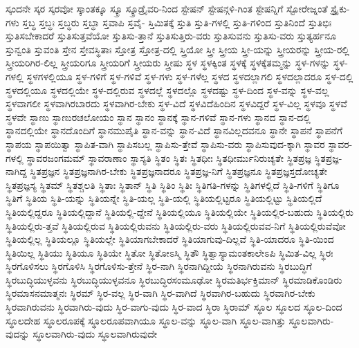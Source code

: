 {ಸ್ಕಂದನೇ
ಸ್ಕರ
ಸ್ಕರವೋ
ಸ್ಕಾಂತಕ್ಕೂ
ಸ್ಕ್ರೂ
ಸ್ಕ್ರೂಡ್ರೈವರಿ-ನಿಂದ
ಸ್ಟೇಷನ್
ಸ್ಟೇಷನ್ಗಳಿ-ಗಿಂತ
ಸ್ಟೇಷನ್ನಿಗೆ
ಸ್ಟೋರೇಜ್ನಂತೆ
ಸ್ಟ್ರೈಕು-ಗಳು
ಸ್ತಬ್ಧ
ಸ್ತಬ್ಧಃ
ಸ್ತಬ್ಧರು
ಸ್ತಬ್ಧಾ
ಸ್ತವಾಪಿ
ಸ್ತವೈ-
ಸ್ತಿಮಿತಕ್ಕೆ
ಸ್ತುತಿ
ಸ್ತುತಿ-ಗಳಲ್ಲಿ
ಸ್ತುತಿ-ಗಳಿಂದ
ಸ್ತುತಿನಿಂದೆ
ಸ್ತುತಿಭಿಃ
ಸ್ತುತಿಸಬೇಕಾದರೆ
ಸ್ತುತಿಸುತ್ತವೆಯೋ
ಸ್ತುತಿಸು-ತ್ತಾನೆ
ಸ್ತುತಿಸುತ್ತಿರು-ವರು
ಸ್ತುತಿಸುವನು
ಸ್ತುತಿಸು-ವರು
ಸ್ತುತ್ಯರ್ಹನೂ
ಸ್ತುನ್ವಂತಿ
ಸ್ತುವಂತಿ
ಸ್ತೇನ
ಸ್ತೇವಸ್ಥಿತಾಃ
ಸ್ತೋತ್ರ
ಸ್ತೋತ್ರ-ದಲ್ಲಿ
ಸ್ತ್ರಿಯೋ
ಸ್ತ್ರೀ
ಸ್ತ್ರೀಯ
ಸ್ತ್ರೀ-ಯನ್ನು
ಸ್ತ್ರೀಯರನ್ನು
ಸ್ತ್ರೀಯ-ರಲ್ಲಿ
ಸ್ತ್ರೀಯರಿಗಿರ-ಲಿಲ್ಲ
ಸ್ತ್ರೀಯರಿಗೂ
ಸ್ತ್ರೀಯರಿಗೆ
ಸ್ತ್ರೀಯರು
ಸ್ತ್ರೀಷು
ಸ್ಥಳ
ಸ್ಥಳಕ್ಕಿಂತ
ಸ್ಥಳಕ್ಕೆ
ಸ್ಥಳಕ್ಕೆತಮ್ಮನ್ನು
ಸ್ಥಳ-ಗಳನ್ನು
ಸ್ಥಳ-ಗಳಲ್ಲಿ
ಸ್ಥಳಗಳಲ್ಲಿಯೂ
ಸ್ಥಳ-ಗಳಿಗೆ
ಸ್ಥಳ-ಗಳಿವೆ
ಸ್ಥಳ-ಗಳು
ಸ್ಥಳ-ಗಳೆಲ್ಲ
ಸ್ಥಳದ
ಸ್ಥಳದಲ್ಲಾಗಲಿ
ಸ್ಥಳದಲ್ಲಾದರೂ
ಸ್ಥಳ-ದಲ್ಲಿ
ಸ್ಥಳದಲ್ಲಿಯೂ
ಸ್ಥಳದಲ್ಲಿಯೇ
ಸ್ಥಳ-ದಲ್ಲಿರುವ
ಸ್ಥಳದಲ್ಲೆ
ಸ್ಥಳದಲ್ಲೊ
ಸ್ಥಳದಷ್ಟು
ಸ್ಥಳ-ದಿಂದ
ಸ್ಥಳ-ವನ್ನು
ಸ್ಥಳ-ವಲ್ಲ
ಸ್ಥಳವಾಗಲೀ
ಸ್ಥಳವಾಗಿರಬಾರದು
ಸ್ಥಳವಾಗಿರ-ಬೇಕು
ಸ್ಥಳ-ವಿದೆ
ಸ್ಥಳವಿದೆಹಿಂದಿನ
ಸ್ಥಳವಿದ್ದರೆ
ಸ್ಥಳ-ವಿಲ್ಲ
ಸ್ಥಳವೂ
ಸ್ಥಳವೆ
ಸ್ಥಳವೇ
ಸ್ಥಾಣು
ಸ್ಥಾಣುರಚಲೋಯಂ
ಸ್ಥಾನ
ಸ್ಥಾನಂ
ಸ್ಥಾನಕ್ಕೆ
ಸ್ಥಾನ-ಗಳಿವೆ
ಸ್ಥಾನ-ಗಳು
ಸ್ಥಾನದ
ಸ್ಥಾನ-ದಲ್ಲಿ
ಸ್ಥಾನದಲ್ಲಿಯೇ
ಸ್ಥಾನದೊಂದಿಗೆ
ಸ್ಥಾನಮುಪೈತಿ
ಸ್ಥಾನ-ವನ್ನು
ಸ್ಥಾನ-ವಿದೆ
ಸ್ಥಾನವಿಲ್ಲದವನೂ
ಸ್ಥಾನೇ
ಸ್ಥಾಪನೆ
ಸ್ಥಾಪನೆಗೆ
ಸ್ಥಾಪಯ
ಸ್ಥಾಪಯಿತ್ವಾ
ಸ್ಥಾಪಿತ-ವಾಗಿ
ಸ್ಥಾಪಿಸಬಲ್ಲ
ಸ್ಥಾಪಿಸು-ತ್ತೇವೆ
ಸ್ಥಾಪಿಸು-ವರು
ಸ್ಥಾಪಿಸುವುದ-ಕ್ಕಾಗಿ
ಸ್ಥಾವರ
ಸ್ಥಾವರ-ಗಳಲ್ಲಿ
ಸ್ಥಾವರಜಂಗಮಮ್
ಸ್ಥಾವರಾಣಾಂ
ಸ್ಥಾಸ್ಯತಿ
ಸ್ಥಿತಂ
ಸ್ಥಿತಃ
ಸ್ಥಿತಧೀಃ
ಸ್ಥಿತಧೀರ್ಮುನಿರುಚ್ಯತೇ
ಸ್ಥಿತಪ್ರಜ್ಞ
ಸ್ಥಿತಪ್ರಜ್ಞ-ನಾಗಿದ್ದ
ಸ್ಥಿತಪ್ರಜ್ಞನ
ಸ್ಥಿತಪ್ರಜ್ಞನಾಗಿರ-ಬೇಕು
ಸ್ಥಿತಪ್ರಜ್ಞನಾದರೂ
ಸ್ಥಿತಪ್ರಜ್ಞ-ನಿಗೆ
ಸ್ಥಿತಪ್ರಜ್ಞನೂ
ಸ್ಥಿತಪ್ರಜ್ಞಸ್ತದೋಚ್ಯತೇ
ಸ್ಥಿತಪ್ರಜ್ಞಸ್ಯ
ಸ್ಥಿತಮ್
ಸ್ಥಿತಶ್ಚಲತಿ
ಸ್ಥಿತಾಃ
ಸ್ಥಿತಾನ್
ಸ್ಥಿತಿ
ಸ್ಥಿತಿಂ
ಸ್ಥಿತಿಃ
ಸ್ಥಿತಿಗತಿ-ಗಳನ್ನು
ಸ್ಥಿತಿಗಳಲ್ಲಿದೆ
ಸ್ಥಿತಿ-ಗಳಿಗೆ
ಸ್ಥಿತಿಗೂ
ಸ್ಥಿತಿಗೆ
ಸ್ಥಿತಿಯ
ಸ್ಥಿತಿ-ಯನ್ನು
ಸ್ಥಿತಿಯನ್ನೇ
ಸ್ಥಿತಿ-ಯಲ್ಲ
ಸ್ಥಿತಿ-ಯಲ್ಲಿ
ಸ್ಥಿತಿಯಲ್ಲಿಟ್ಟರೂ
ಸ್ಥಿತಿಯಲ್ಲಿಟ್ಟು
ಸ್ಥಿತಿಯಲ್ಲಿದೆ
ಸ್ಥಿತಿಯಲ್ಲಿದ್ದರೂ
ಸ್ಥಿತಿಯಲ್ಲಿದ್ದಾನೆ
ಸ್ಥಿತಿಯಲ್ಲಿ-ದ್ದೇನೆ
ಸ್ಥಿತಿಯಲ್ಲಿಯೂ
ಸ್ಥಿತಿಯಲ್ಲಿಯೇ
ಸ್ಥಿತಿಯಲ್ಲಿರ-ಬಹುದು
ಸ್ಥಿತಿಯಲ್ಲಿರು
ಸ್ಥಿತಿಯಲ್ಲಿರು-ತ್ತವೆ
ಸ್ಥಿತಿಯಲ್ಲಿರುವ
ಸ್ಥಿತಿಯಲ್ಲಿರುವನು
ಸ್ಥಿತಿಯಲ್ಲಿರು-ವರು
ಸ್ಥಿತಿಯಲ್ಲಿರುವವ-ನಿಗೆ
ಸ್ಥಿತಿಯಲ್ಲಿರುವೆವೋ
ಸ್ಥಿತಿಯಲ್ಲಿಲ್ಲ
ಸ್ಥಿತಿಯಲ್ಲೂ
ಸ್ಥಿತಿಯಲ್ಲೇ
ಸ್ಥಿತಿಯಾಗಬೇಕಾದರೆ
ಸ್ಥಿತಿಯಾಗುವು-ದಿಲ್ಲವೆ
ಸ್ಥಿತಿ-ಯಾದರೂ
ಸ್ಥಿತಿ-ಯಿಂದ
ಸ್ಥಿತಿಯಿಲ್ಲ
ಸ್ಥಿತಿಯು
ಸ್ಥಿತಿಯೂ
ಸ್ಥಿತಿಯೇ
ಸ್ಥಿತೋ
ಸ್ಥಿತೋಽಸ್ಮಿ
ಸ್ಥಿತೌ
ಸ್ಥಿತ್ವಾಸ್ಯಾಮಂತಕಾಲೇಽಪಿ
ಸ್ಥಿಮಿತ-ವಿಲ್ಲ
ಸ್ಥಿರಃ
ಸ್ಥಿರಗೊಳಿಸಲು
ಸ್ಥಿರಗೊಳಿಸಿ
ಸ್ಥಿರಗೊಳಿಸು-ತ್ತೇನೆ
ಸ್ಥಿರ-ನಾಗಿ
ಸ್ಥಿರನಾಗಿದ್ದೀಯೆ
ಸ್ಥಿರನಾಗಿರುವನು
ಸ್ಥಿರಬುದ್ಧಿಗೆ
ಸ್ಥಿರಬುದ್ಧಿಯುಳ್ಳವನು
ಸ್ಥಿರಬುದ್ಧಿಯುಳ್ಳವನೂ
ಸ್ಥಿರಬುದ್ಧಿರಸಂಮೂಢೋ
ಸ್ಥಿರಮತಿರ್ಭಕ್ತಿಮಾನ್
ಸ್ಥಿರಮಾಡಿಕೊಂಡಿರು
ಸ್ಥಿರಮಾಸನಮಾತ್ಮನಃ
ಸ್ಥಿರಮ್
ಸ್ಥಿರ-ವಲ್ಲ
ಸ್ಥಿರ-ವಾಗಿ
ಸ್ಥಿರ-ವಾಗಿದೆ
ಸ್ಥಿರವಾಗಿರ-ಬಹುದು
ಸ್ಥಿರವಾಗಿರ-ಬೇಕು
ಸ್ಥಿರವಾಗಿರುವನು
ಸ್ಥಿರವಾಗಿರು-ವುದು
ಸ್ಥಿರ-ವಾಗು-ವುದು
ಸ್ಥಿರ-ವಾದ
ಸ್ಥಿರಾ
ಸ್ಥಿರಾಮ್
ಸ್ಥೂಲ
ಸ್ಥೂಲದ
ಸ್ಥೂಲ-ದಿಂದ
ಸ್ಥೂಲದೇಹ
ಸ್ಥೂಲರೂಪಕ್ಕೆ
ಸ್ಥೂಲರೂಪವಾಗಿಯೂ
ಸ್ಥೂಲ-ವನ್ನು
ಸ್ಥೂಲ-ವಾಗಿ
ಸ್ಥೂಲ-ವಾಗಿತ್ತು
ಸ್ಥೂಲವಾಗಿರು-ವುದನ್ನು
ಸ್ಥೂಲವಾಗಿರು-ವುದು
ಸ್ಥೂಲವಾಗಿರುವುದೇ
}
